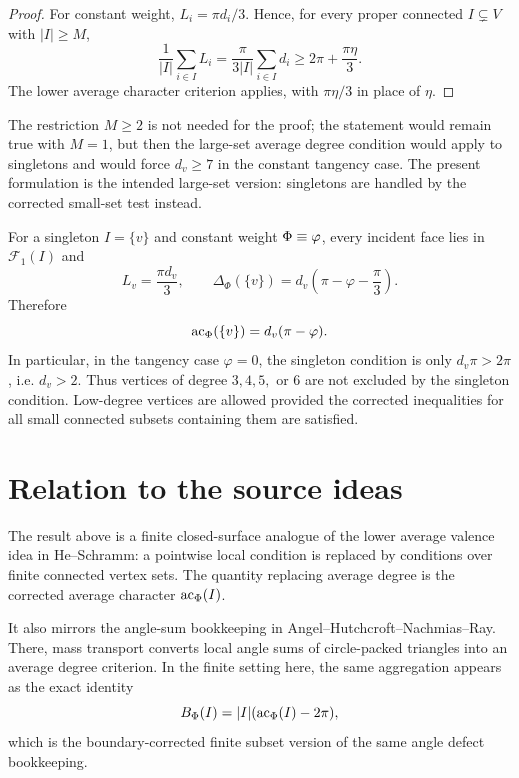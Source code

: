 \begin{proof}
For constant weight, $L_i=\pi d_i/3$.  Hence, for every proper connected
$I\subsetneq V$ with $|I|\ge M$,
\[
  \frac1{|I|}\sum_{i\in I}L_i
  =
  \frac{\pi}{3|I|}\sum_{i\in I}d_i
  \ge
  2\pi+\frac{\pi\eta}{3}.
\]
The lower average character criterion applies, with $\pi\eta/3$ in place
of $\eta$.
\end{proof}

\begin{remark}
The restriction $M\ge2$ is not needed for the proof; the statement would
remain true with $M=1$, but then the large-set average degree condition
would apply to singletons and would force $d_v\ge7$ in the constant
tangency case.  The present formulation is the intended large-set version:
singletons are handled by the corrected small-set test instead.

For a singleton $I=\{v\}$ and constant weight $\Phi\equiv\varphi$, every
incident face lies in $\mathcal F_1(I)$ and
\[
  L_v=\frac{\pi d_v}{3},\qquad
  \Delta_\Phi(\{v\})
  =
  d_v\left(\pi-\varphi-\frac{\pi}{3}\right).
\]
Therefore
\[
  \operatorname{ac}_\Phi(\{v\})=d_v(\pi-\varphi).
\]
In particular, in the tangency case $\varphi=0$, the singleton condition is
only $d_v\pi>2\pi$, i.e. $d_v>2$.  Thus vertices of degree $3,4,5,$ or $6$
are not excluded by the singleton condition.  Low-degree vertices are
allowed provided the corrected inequalities for all small connected
subsets containing them are satisfied.
\end{remark}

\section{Relation to the source ideas}

The result above is a finite closed-surface analogue of the lower average
valence idea in He--Schramm: a pointwise local condition is replaced by
conditions over finite connected vertex sets.  The quantity replacing
average degree is the corrected average character $\operatorname{ac}_\Phi(I)$.

It also mirrors the angle-sum bookkeeping in
Angel--Hutchcroft--Nachmias--Ray.  There, mass transport converts local
angle sums of circle-packed triangles into an average degree criterion.  In
the finite setting here, the same aggregation appears as the exact identity
\[
  B_\Phi(I)=|I|(\operatorname{ac}_\Phi(I)-2\pi),
\]
which is the boundary-corrected finite subset version of the same angle
defect bookkeeping.
